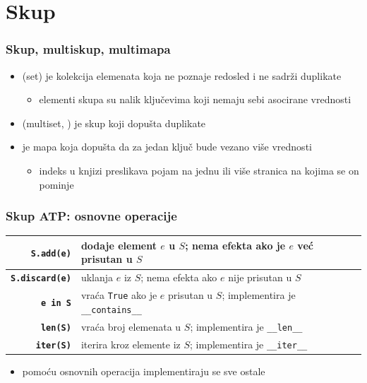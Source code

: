 \documentclass[compress]{beamer}
\begin{document}
\section[Skup]{Skup}
\begin{frame}[fragile]
  \frametitle{Skup, multiskup, multimapa}
  \begin{itemize}
    \item {} (set) je kolekcija elemenata koja ne poznaje redosled i ne sadrži duplikate
    \begin{itemize}
      \item elementi skupa su nalik ključevima koji nemaju sebi asocirane vrednosti
    \end{itemize}
    \item {} (multiset, ) je skup koji dopušta duplikate
    \item {} je mapa koja dopušta da za jedan ključ bude vezano više vrednosti
    \begin{itemize}
      \item indeks u knjizi preslikava pojam na jednu ili više stranica na kojima se on pominje
    \end{itemize}
  \end{itemize}
\end{frame}

\begin{frame}[fragile]
  \frametitle{Skup ATP: osnovne operacije}
  \begin{center}
    \begin{tabular}{rp{8cm}}
      \textbf{\texttt{S.add(e)}} & dodaje element $e$ u $S$; nema efekta ako je $e$ već prisutan u $S$\\ \hline
      \textbf{\texttt{S.discard(e)}} & uklanja $e$ iz $S$; nema efekta ako $e$ nije prisutan u $S$\\ \hline
      \textbf{\texttt{e in S}} & vraća \texttt{True} ako je $e$ prisutan u $S$; implementira je \texttt{\_\_contains\_\_} \\ \hline
      \textbf{\texttt{len(S)}} & vraća broj elemenata u $S$; implementira je \texttt{\_\_len\_\_} \\ \hline
      \textbf{\texttt{iter(S)}} & iterira kroz elemente iz $S$; implementira je \texttt{\_\_iter\_\_} \\
    \end{tabular}
  \end{center}
  \begin{itemize}
    \item pomoću osnovnih operacija implementiraju se sve ostale
  \end{itemize}
\end{frame}
\end{document}
